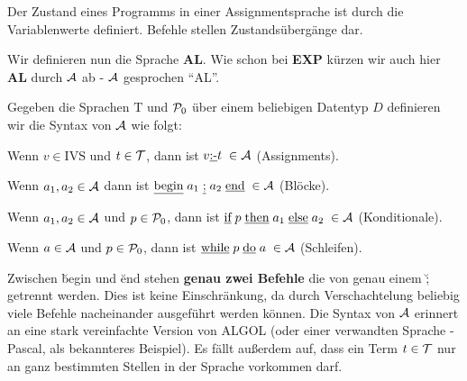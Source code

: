 Der Zustand eines Programms in einer Assignmentsprache ist durch die Variablenwerte definiert.
Befehle stellen Zustandsübergänge dar.

Wir definieren nun die Sprache \textbf{AL}.
Wie schon bei \textbf{EXP} kürzen wir auch hier \textbf{AL} durch $\mathcal{A}$ ab - $\mathcal{A}$ gesprochen ``AL''.
\begin{defn}
Gegeben die Sprachen $\text{T}$ und $\mathcal{P}_0$ über einem beliebigen Datentyp $D$
definieren wir die Syntax von $\mathcal{A}$ wie folgt:
\begin{\whichenum}
\item Wenn $v \in \text{IVS}$ und $t \in \mathcal{T}$,
dann ist $v \text{\underline{:-}} t \; \in \mathcal{A}$ (Assignments).
\item Wenn $a_1,a_2 \in \mathcal{A}$ dann ist $\text{\underline{begin}} \; a_1 \; \text{\underline{;}} \; a_2 \; \text{\underline{end}} \; \in \mathcal{A}$ (Blöcke).
\item Wenn $a_1,a_2 \in \mathcal{A}$ und $p \in \mathcal{P}_0$, dann ist $\text{\underline{if}} \; p \; \text{\underline{then}} \; a_1 \; \text{\underline{else}} \; a_2 \; \in \mathcal{A}$ (Konditionale).
\item Wenn $a \in \mathcal{A}$ und $p \in \mathcal{P}_0$, dann ist $\text{\underline{while}} \; p \; \text{\underline{do}} \; a \; \in \mathcal{A}$ (Schleifen).
\end{\whichenum}
\end{defn}

Zwischen \u{begin} und \u{end} stehen \textbf{genau zwei Befehle} die von genau einem \u{;} getrennt werden. Dies ist keine Einschränkung, da durch Verschachtelung beliebig viele Befehle nacheinander
ausgeführt werden können. Die Syntax von $\mathcal{A}$ erinnert an eine stark vereinfachte Version von ALGOL (oder einer verwandten Sprache - Pascal, als bekannteres Beispiel).
Es fällt außerdem auf, dass ein Term $t \in \mathcal{T}$ nur an ganz bestimmten Stellen in der Sprache vorkommen darf.

